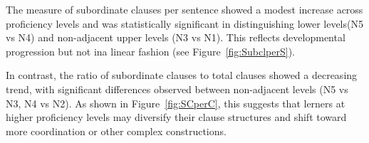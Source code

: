 
The measure of subordinate clauses per sentence showed a modest increase across proficiency levels and was
statistically significant in distinguishing lower levels(N5 vs N4) and non-adjacent upper levels (N3 vs N1). This
reflects developmental progression but not ina  linear fashion (see Figure~\ref{fig:SubclperS}).

In contrast, the ratio of subordinate clauses to total clauses showed a decreasing trend, with significant
differences observed between non-adjacent levels (N5 vs N3, N4 vs N2).  As shown in Figure~\ref{fig:SCperC}, this
suggests that lerners at higher proficiency levels may diversify their clause structures and shift toward more
coordination or other complex constructions.


